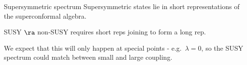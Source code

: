 \documentclass[%
ps,accumulate,
colorBG, slideColor,
total,
serpaggi
%
]{prosper}
\newcommand{\apm}{{\alpha^{\prime}}}
\begin{document}
%
%
%
%
%


\begin{slide}{Supersymmetric spectrum}
%
 Supersymmetric states lie in short representations of the
 superconformal algebra.

 SUSY $\ra$ non-SUSY requires short reps joining to
 form a long rep.

 \vp We expect that this will only happen at special points - e.g.\
 $\lambda=0$, so the SUSY spectrum could match between small and
 large coupling.
%
\end{slide}
\end{document}
